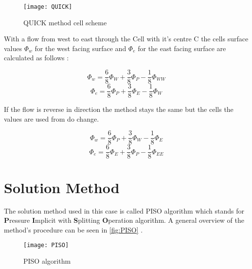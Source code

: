 \documentclass[../thesis.tex]{subfiles}
\begin{document}
\begin{figure}[htbp]
	\centering
	\texttt{[image: QUICK]}
	\caption{QUICK method cell scheme}
	\label{fig:QUICK}
\end{figure}

With a flow from west to east through the Cell with it's centre C the cells surface values $\Phi_w$ for the west facing surface and $\Phi_e$ for the east facing surface are calculated as follows \cite{versteeg2007introduction}:

\begin{equation}
	\Phi_w = \dfrac{6}{8} \Phi_W + \dfrac{3}{8} \Phi_P - \dfrac{1}{8} \Phi_{WW}
\end{equation}
\begin{equation}
	\Phi_e = \dfrac{6}{8} \Phi_P + \dfrac{3}{8} \Phi_E - \dfrac{1}{8} \Phi_{W}
\end{equation}

If the flow is reverse in direction the method stays the same but the cells the values are used from do change.

\begin{equation}
	\Phi_w = \dfrac{6}{8} \Phi_P + \dfrac{3}{8} \Phi_W - \dfrac{1}{8} \Phi_{E}
\end{equation}
\begin{equation}
	\Phi_e = \dfrac{6}{8} \Phi_E + \dfrac{3}{8} \Phi_P - \dfrac{1}{8} \Phi_{EE}
\end{equation}

\section{Solution Method}
\label{sec:sol_method}

The solution method used in this case is called PISO algorithm which stands for \textbf{P}ressure \textbf{I}mplicit with \textbf{S}plitting \textbf{O}peration algorithm. A general overview of the method's procedure can be seen in \autoref{fig:PISO} \cite{versteeg2007introduction}.

\begin{figure}[htbp]
	\centering
	\texttt{[image: PISO]}
	\caption{PISO algorithm}
	\label{fig:PISO}
\end{figure}
\end{document}

